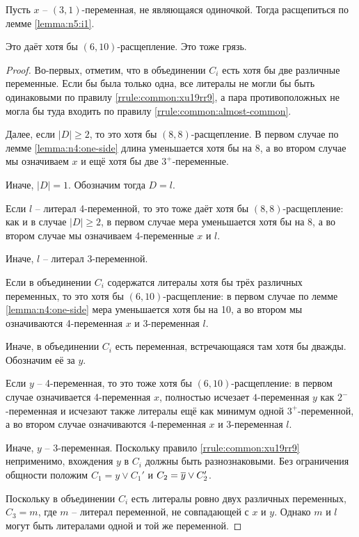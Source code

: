 \begin{brule}
 Пусть $x$ -- $(3,1)$-переменная, не являющаяся одиночкой. 
 Тогда расщепиться по лемме \ref{lemma:n5:i1}.

 Это даёт хотя бы $(6,10)$-расщепление.
 {\color{white} Это тоже грязь.}
 \label{brule:n4:31:ns}
\end{brule}

\begin{proof}
 Во-первых, отметим, что в объединении $C_i$ есть хотя бы две различные переменные.
 Если бы была только одна, все литералы не могли бы быть одинаковыми по правилу \ref{rrule:common:xu19rr9}, а пара противоположных не могла бы туда входить по правилу \ref{rrule:common:almost-common}.

 Далее, если $|D| \geq 2$, то это хотя бы $(8,8)$-расщепление. В первом случае по лемме \ref{lemma:n4:one-side} длина уменьшается хотя бы на 8, а во втором случае мы означиваем $x$ и ещё хотя бы две $3^+$-переменные.

 Иначе, $|D| = 1$. Обозначим тогда $D = l$.

 Если $l$ -- литерал 4-переменной, то это тоже даёт хотя бы $(8,8)$-расщепление: как и в случае $|D| \geq 2$, в первом случае мера уменьшается хотя бы на 8, а во втором случае мы означиваем 4-переменные $x$ и $l$.

 Иначе, $l$ -- литерал 3-переменной.

 Если в объединении $C_i$ содержатся литералы хотя бы трёх различных переменных, то это хотя бы $(6,10)$-расщепление: в первом случае по лемме \ref{lemma:n4:one-side} мера уменьшается хотя бы на 10, а во втором мы означиваются 4-переменная $x$ и 3-переменная $l$.

 Иначе, в объединении $C_i$ есть переменная, встречающаяся там хотя бы дважды.
 Обозначим её за $y$.

 Если $y$ -- 4-переменная, то это тоже хотя бы $(6,10)$-расщепление: в первом случае означивается 4-переменная $x$, полностью исчезает $4$-переменная $y$ как $2^-$-переменная и исчезают также литералы ещё как минимум одной $3^+$-переменной, а во втором случае означиваются 4-переменная $x$ и 3-переменная $l$.

 Иначе, $y$ -- 3-переменная. Поскольку правило \ref{rrule:common:xu19rr9} неприменимо, вхождения $y$ в $C_i$ должны быть разнознаковыми. Без ограничения общности положим $C_1 = y \vee C_1'$ и $C_2 = \overline{y} \vee C_2'$.

 Поскольку в объединении $C_i$ есть литералы ровно двух различных переменных, $C_3 = m$, где $m$ -- литерал переменной, не совпадающей с $x$ и $y$. Однако $m$ и $l$ могут быть литералами одной и той же переменной.


\end{proof}
